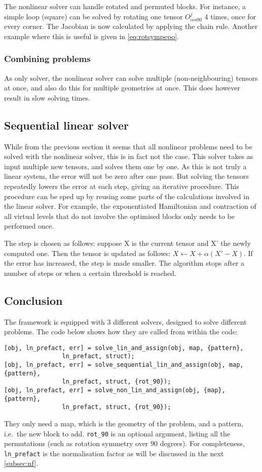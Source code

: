 The nonlinear solver can handle rotated and permuted blocks. For instance, a simple loop (square) can be solved by rotating one tensor $O^{j }_{ \alpha \alpha 0 0}$ 4 times, once for every corner. The Jacobian is now calculated by applying the chain rule. Another example where this is useful is given in \cref{eq:rotsympepo}.

\subsubsection{Combining problems}
As only solver, the nonlinear solver can solve multiple (non-neighbouring) tensors at once, and also do this for multiple geometries at once. This does however result in slow solving times.

\subsection{Sequential linear solver}
While from the previous section it seems that all nonlinear problems need to be solved with the nonlinear solver, this is in fact not the case. This solver takes as input multiple new tensors, and solves them one by one. As this is not truly a linear system, the error will not be zero after one pass. But solving the tensors repeatedly lowers the error at each step, giving an iterative procedure. This procedure can be sped up by reusing some parts of the calculations involved in the linear solver. For example, the exponentiated Hamiltonian and contraction of all virtual levels that do not involve the optimised blocks only needs to be performed once.

The step is chosen as follows: suppose X is the current tensor and X' the newly computed one. Then the tensor is updated as follows: $X \leftarrow X + \alpha (X'-X)$. If the error has increased, the step is made smaller. The algorithm stops after a number of steps or when a certain threshold is reached.

\subsection{Conclusion}

The framework is equipped with 3 different solvers, designed to solve different problems. The code below shows how they are called from within the code:
\begin{verbatim}
[obj, ln_prefact, err] = solve_lin_and_assign(obj, map, {pattern}, 
                ln_prefact, struct);
[obj, ln_prefact, err] = solve_sequential_lin_and_assign(obj, map, {pattern},
                ln_prefact, struct, {rot_90});
[obj, ln_prefact, err] = solve_non_lin_and_assign(obj, {map}, {pattern}, 
                ln_prefact, struct, {rot_90});
\end{verbatim}
They only need a map, which is the geometry of the problem, and a pattern, i.e.\ the new block to add. \verb#rot_90# is an optional argument, listing all the permutations (such as rotation symmetry over 90 degrees). For completeness, \verb#ln_prefact# is the normalisation factor as will be discussed in the next \cref{subsec:nf}.

